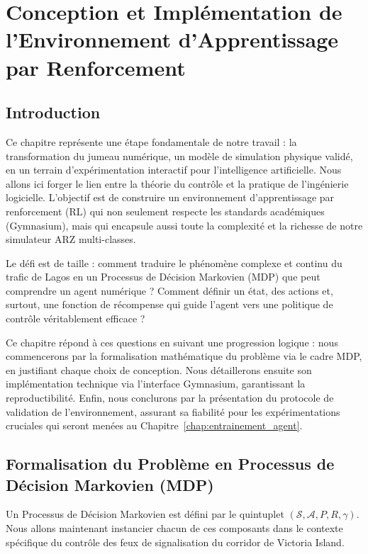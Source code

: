\chapter{Conception et Implémentation de l'Environnement d'Apprentissage par Renforcement}
\label{chap:conception_env_rl}

\section{Introduction}
\label{sec:intro_conception_rl}

Ce chapitre représente une étape fondamentale de notre travail : la transformation du jumeau numérique, un modèle de simulation physique validé, en un terrain d'expérimentation interactif pour l'intelligence artificielle. Nous allons ici forger le lien entre la théorie du contrôle et la pratique de l'ingénierie logicielle. L'objectif est de construire un environnement d'apprentissage par renforcement (RL) qui non seulement respecte les standards académiques (Gymnasium), mais qui encapsule aussi toute la complexité et la richesse de notre simulateur ARZ multi-classes.

Le défi est de taille : comment traduire le phénomène complexe et continu du trafic de Lagos en un Processus de Décision Markovien (MDP) que peut comprendre un agent numérique ? Comment définir un état, des actions et, surtout, une fonction de récompense qui guide l'agent vers une politique de contrôle véritablement efficace ?

Ce chapitre répond à ces questions en suivant une progression logique : nous commencerons par la formalisation mathématique du problème via le cadre MDP, en justifiant chaque choix de conception. Nous détaillerons ensuite son implémentation technique via l'interface Gymnasium, garantissant la reproductibilité. Enfin, nous conclurons par la présentation du protocole de validation de l'environnement, assurant sa fiabilité pour les expérimentations cruciales qui seront menées au Chapitre~\ref{chap:entrainement_agent}.

\section{Formalisation du Problème en Processus de Décision Markovien (MDP)}
\label{sec:formalisation_mdp}

Un Processus de Décision Markovien est défini par le quintuplet $(\mathcal{S}, \mathcal{A}, P, R, \gamma)$.
Nous allons maintenant instancier chacun de ces composants dans le contexte spécifique du contrôle des feux de signalisation du corridor de Victoria Island.

